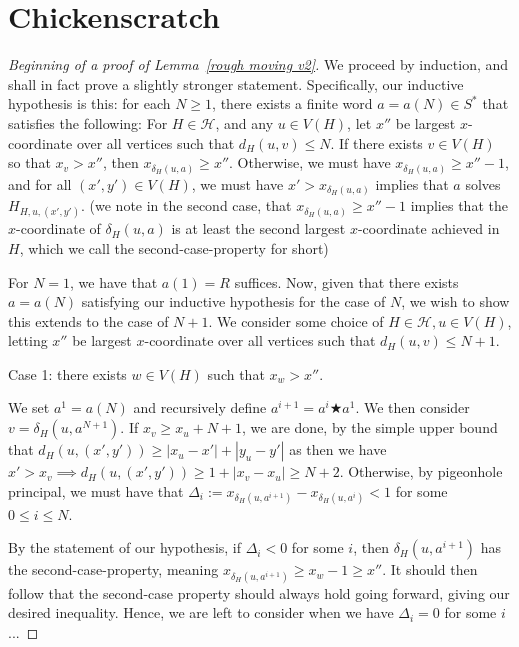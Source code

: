 \documentclass[a4paper]{article}
\theoremstyle{definition}
\begin{document}
\section{Chickenscratch} \label{cs}
\begin{proof}[Beginning of a proof of Lemma~\ref*{rough moving v2}]
    We proceed by induction, and shall in fact prove a slightly stronger statement. Specifically, our inductive hypothesis is this: for each $N\ge 1$, there exists a finite word $a = a(N) \in S^*$ that satisfies the following: 
    For $H\in \mathcal{H}$, and any $u \in V(H)$, let $x''$ be largest $x$-coordinate over all vertices such that $d_H(u,v)\le N$. If there exists $v \in V(H)$ so that $x_v > x''$, then $x_{\delta_H(u,a)} \ge x''$. Otherwise, we must have $x_{\delta_H(u,a)} \ge x''-1$, and for all $(x',y') \in V(H)$, we must have $x' >x_{\delta_H(u,a)}$ implies that $a$ solves $H_{H,u,(x',y')}$. (we note in the second case, that $x_{\delta_H(u,a)}\ge x''-1$ implies that the $x$-coordinate of $\delta_H(u,a)$ is at least the second largest $x$-coordinate achieved in $H$, which we call the second-case-property for short)
    
    
    For $N = 1$, we have that $a(1) = R$ suffices. Now, given that there exists $a = a(N)$ satisfying our inductive hypothesis for the case of $N$, we wish to show this extends to the case of $N+1$. We consider some choice of $H\in \mathcal{H},u \in V(H)$, letting $x''$ be largest $x$-coordinate over all vertices such that $d_H(u,v)\le N+1$.
    
    
    
    Case 1: there exists $w \in V(H)$ such that $x_w > x''$.
    
    We set $a^1 = a(N)$ and recursively define $a^{i+1} = a^i\bigstar a^1$. We then consider $v = \delta_H(u,a^{N+1})$. If $x_v \ge x_u + N+1$, we are done, by the simple upper bound that $d_H(u,(x',y')) \ge |x_u-x'|+|y_u-y'|$ as then we have $x' > x_v \implies d_H(u,(x',y'))\ge 1+|x_v-x_u| \ge N+2$. Otherwise, by pigeonhole principal, we must have that $\Delta_i := x_{\delta_H(u,a^{i+1})}-x_{\delta_H(u,a^i)}<1$ for some $0\le i\le N$.
    
    By the statement of our hypothesis, if $\Delta_i < 0$ for some $i$, then $\delta_H(u,a^{i+1})$ has the second-case-property, meaning $x_{\delta_H(u,a^{i+1})}\ge x_w-1 \ge x''$. It should then follow that the second-case property should always hold going forward, giving our desired inequality. Hence, we are left to consider when we have $\Delta_i = 0$ for some $i$... 
\end{proof}
\end{document}
